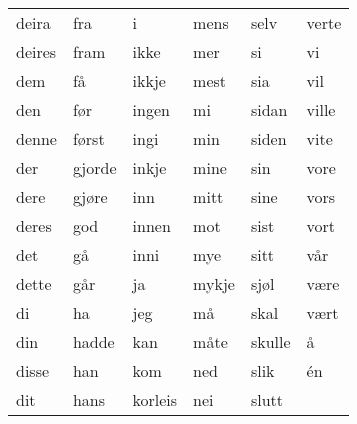 \begin{table}[htbp]
\begin{tabular}{l l l l l l}
    deira & fra & i & mens & selv & verte \\
    deires & fram & ikke & mer & si & vi \\
    dem & få & ikkje & mest & sia & vil \\
    den & før & ingen & mi & sidan & ville \\
    denne & først & ingi & min & siden & vite \\
    der & gjorde & inkje & mine & sin & vore \\
    dere & gjøre & inn & mitt & sine & vors \\
    deres & god & innen & mot & sist & vort \\
    det & gå & inni & mye & sitt & vår \\
    dette & går & ja & mykje & sjøl & være \\
    di & ha & jeg & må & skal & vært \\
    din & hadde & kan & måte & skulle & å \\
    disse & han & kom & ned & slik & én \\
    dit & hans & korleis & nei & slutt &  \\
    \bottomrule
\end{tabular}
\end{table}


